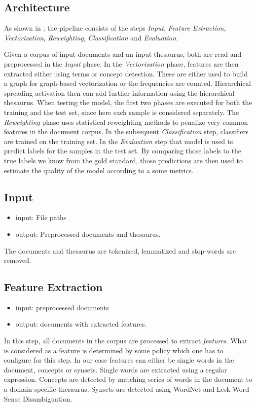 \documentclass{article}
\begin{document}
\subsection{Architecture}
As shown in , the pipeline consists of the steps
\emph{Input}, \emph{Feature Extraction}, \emph{Vectorization}, \emph{Reweighting}, \emph{Classification} and \emph{Evaluation}.

Given a corpus of input documents and an input thesaurus,
both are read and preprocessed in the \emph{Input} phase.
In the \emph{Vectorization} phase, features are then extracted either using terms or concept detection.
These are either used to build a graph for graph-based vectorization or the frequencies are counted.
Hierarchical spreading activation then can add further information using the hierarchical thesaurus.
When testing the model, the first two phases are executed for both the training and the test set,
since here each sample is considered separately.
The \emph{Reweighting} phase uses statistical reweighting methods to penalize very common features in the
document corpus.
In the subsequent \emph{Classification} step, classifiers are trained on the training set.
In the \emph{Evaluation} step that model is used to predict labels for the samples in the test set.
By comparing those labels to the true labels we know from the gold standard, those
predictions are then used to estimate the quality of the model according to a
some metrics.
\subsection{Input}
\begin{itemize}
  \item input: File paths
  \item output: Preprocessed documents and thesaurus.
\end{itemize}
The documents and thesaurus are tokenized, lemmatized and stop-words are removed.

\subsection{Feature Extraction}
\begin{itemize}
  \item input: preprocessed documents
  \item output: documents with extracted features.
\end{itemize}
In this step, all documents in the corpus are processed to extract \emph{features}.
What is considered as a feature is determined by some policy which one has to configure for this step.
In our case features can either be single words in the document, concepts or synsets.
Single words are extracted using a regular expression.
Concepts are detected by matching series of words in the document to a domain-specific thesaurus.
Synsets are detected using WordNet and Lesk Word Sense Disambiguation.
\end{document}
